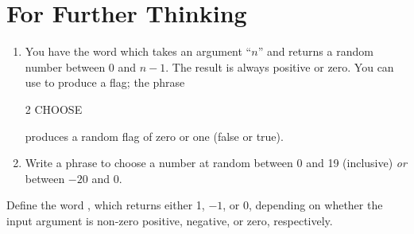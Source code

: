 
\section{For Further Thinking}

\ifeightyfour\begin{enumerate}
\item
You have the word  which takes an argument ``$n$''
and returns a random number between 0 and $n-1$. The result is always
positive or zero.  You can use  to produce a flag; the
phrase
\begin{Code}
2 CHOOSE
\end{Code}
produces a random flag of zero or one (false or true).

\item
Write a phrase to choose a number at random between 0 and 19 (inclusive)
\emph{or} between $-20$ and 0.
\end{enumerate}\else
Define the word , which returns either 1,
$-1$, or 0, depending on whether the input argument is non-zero
positive, negative, or zero, respectively.
\fi
